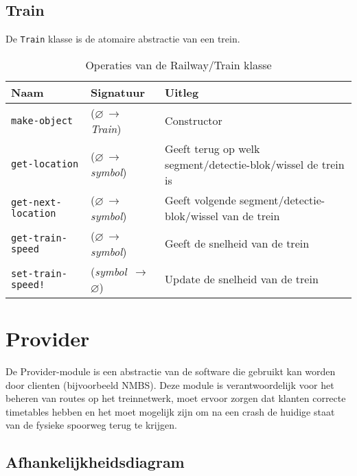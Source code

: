 \documentclass[a4paper, 11pt]{article}
\newcommand{\naar}{\,$\rightarrow$\,}
\renewcommand{\empty}{$\varnothing$}
\newcommand{\<}{\scriptsize\textless\normalsize}
\renewcommand{\>}{\scriptsize\textgreater\normalsize}
\begin{document}
\subsection{Train} %
De \texttt{Train} klasse is de atomaire abstractie van een trein.
\begin{table}[H]
	\begin{center}
		\begin{tabular}{|l l l|}
			\hline
			\textbf{Naam} & \textbf{Signatuur} & \textbf{Uitleg}\\
			\hline
			\texttt{make-object} & (\empty \naar \textit{Train}) & Constructor\\
			\hline
			\texttt{get-location} & (\empty \naar \textit{symbol}) & Geeft terug op welk segment/detectie-blok/wissel de trein is\\
			\texttt{get-next-location} & (\empty \naar \textit{symbol}) & Geeft volgende segment/detectie-blok/wissel van de trein\\
			\texttt{get-train-speed} & (\empty \naar \textit{symbol}) & Geeft de snelheid van de trein\\
			\texttt{set-train-speed!} & (\textit{symbol} \naar \empty) & Update de snelheid van de trein\\
			\hline
		\end{tabular}
		\caption{Operaties van de Railway/Train klasse}
	\end{center}
\end{table}

\newpage

\section{Provider} %
De Provider-module is een abstractie van de software die gebruikt kan worden door clienten (bijvoorbeeld NMBS). Deze module is verantwoordelijk voor het beheren van routes op het treinnetwerk, moet ervoor zorgen dat klanten correcte timetables hebben en het moet mogelijk zijn om na een crash de huidige staat van de fysieke spoorweg terug te krijgen.

\subsection{Afhankelijkheidsdiagram} %
\begin{center}
\end{center}
\end{document}
